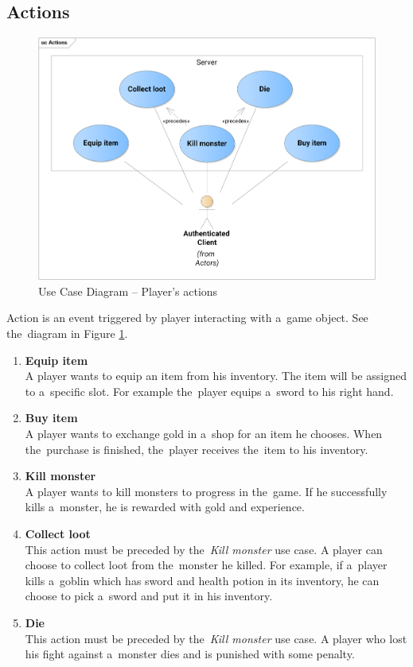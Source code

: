 	\subsection{Actions}	
		\begin{figure}[h]	
			\includegraphics[width=\textwidth]{figures/UC_Actions}
			\centering			
			\caption{Use Case Diagram -- Player's actions}
			\label{fig:ucactions}
		\end{figure}
		\noindent Action is an event triggered by player interacting with a~game object. See the~diagram in Figure \ref{fig:ucactions}.
		
		\begin{enumerate}
			\item \textbf{Equip item} \\
			A player wants to equip an item from his inventory. The item will be assigned to a~specific slot. For example the~player equips a~sword to his right hand.
			
			\item \textbf{Buy item} \\
			A player wants to exchange gold in a~shop for an item he chooses. When the~purchase is finished, the~player receives the~item to his inventory.
			
			\item \textbf{Kill monster} \\
			A player wants to kill monsters to progress in the~game. If he successfully kills a~monster, he is rewarded with gold and experience.
			
			\item \textbf{Collect loot} \\
			This action must be preceded by the~\textit{Kill monster} use case. A player can choose to collect loot from the~monster he killed. For example, if a~player kills a~goblin which has sword and health potion in its inventory, he can choose to pick a~sword and put it in his inventory.
			
			\item \textbf{Die} \\
			This action must be preceded by the~\textit{Kill monster} use case. A player who lost his fight against a~monster dies and is punished with some penalty.		
		\end{enumerate}
	
